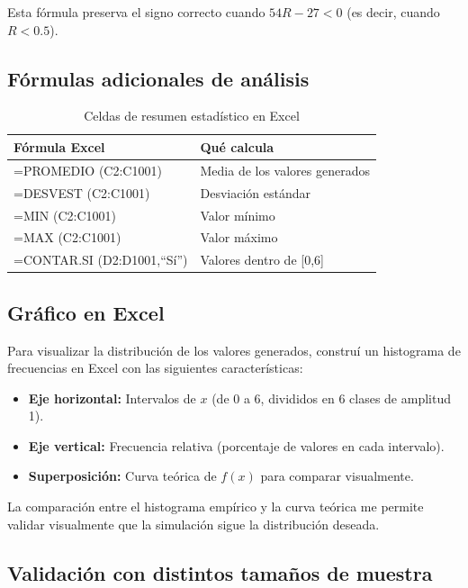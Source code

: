 \documentclass[12pt,a4paper]{article}
\begin{document}
Esta fórmula preserva el signo correcto cuando $54R - 27 < 0$ (es decir, cuando $R < 0.5$).

\subsection{Fórmulas adicionales de análisis}

\begin{table}[H]
\centering
\caption{Celdas de resumen estadístico en Excel}
\begin{tabular}{>{\ttfamily}l l}
\toprule
\textbf{Fórmula Excel} & \textbf{Qué calcula} \\
\midrule
\textrm{=PROMEDIO (C2:C1001)} & Media de los valores generados \\
\textrm{=DESVEST (C2:C1001)} & Desviación estándar \\
\textrm{=MIN (C2:C1001)} & Valor mínimo \\
\textrm{=MAX (C2:C1001)} & Valor máximo \\
\textrm{=CONTAR.SI (D2:D1001,``Sí'')} & Valores dentro de [0,6] \\

\bottomrule
\end{tabular}
\end{table}

\subsection{Gráfico en Excel}

Para visualizar la distribución de los valores generados, construí un histograma de frecuencias en Excel con las siguientes características:

\begin{itemize}
  \item \textbf{Eje horizontal:} Intervalos de $x$ (de 0 a 6, divididos en 6 clases de amplitud 1).
  \item \textbf{Eje vertical:} Frecuencia relativa (porcentaje de valores en cada intervalo).
  \item \textbf{Superposición:} Curva teórica de $f(x)$ para comparar visualmente.
\end{itemize}

La comparación entre el histograma empírico y la curva teórica me permite validar visualmente que la simulación sigue la distribución deseada.

\subsection{Validación con distintos tamaños de muestra}
\end{document}
